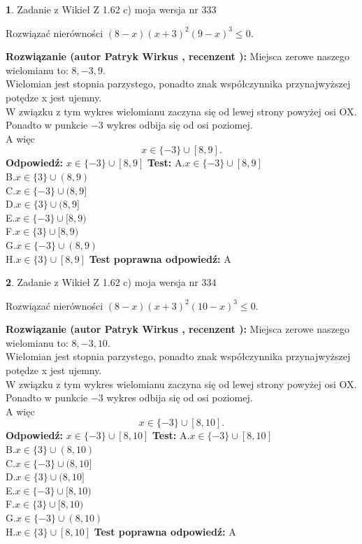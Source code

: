 \documentclass[12pt, a4paper]{article}
\theoremstyle{definition} %
\newtheorem{zad}{}
\newcommand{\zadStart}[1]{\begin{zad}#1\newline}
\newcommand{\zadStop}{\end{zad}}
\newcommand{\rozwStart}[2]{\noindent \textbf{Rozwiązanie (autor #1 , recenzent #2): }\newline}
\newcommand{\rozwStop}{\newline}
\newcommand{\odpStart}{\noindent \textbf{Odpowiedź:}\newline}
\newcommand{\odpStop}{\newline}
\newcommand{\testStart}{\noindent \textbf{Test:}\newline}
\newcommand{\testStop}{\newline}
\newcommand{\kluczStart}{\noindent \textbf{Test poprawna odpowiedź:}\newline}
\newcommand{\kluczStop}{\newline}
\begin{document}
\zadStart{Zadanie z Wikieł Z 1.62 c) moja wersja nr 333}

Rozwiązać nierówności $(8-x)(x+3)^{2}(9-x)^{3}\le0$.
\zadStop
\rozwStart{Patryk Wirkus}{}
Miejsca zerowe naszego wielomianu to: $8, -3, 9$.\\
Wielomian jest stopnia parzystego, ponadto znak współczynnika przy\linebreak najwyższej potędze x jest ujemny.\\ W związku z tym wykres wielomianu zaczyna się od lewej strony powyżej osi OX.\\
Ponadto w punkcie $-3$ wykres odbija się od osi poziomej.\\
A więc $$x \in \{-3\} \cup [8,9].$$
\rozwStop
\odpStart
$x \in \{-3\} \cup [8,9]$
\odpStop
\testStart
A.$x \in \{-3\} \cup [8,9]$\\
B.$x \in \{3\} \cup (8,9)$\\
C.$x \in \{-3\} \cup (8,9]$\\
D.$x \in \{3\} \cup (8,9]$\\
E.$x \in \{-3\} \cup [8,9)$\\
F.$x \in \{3\} \cup [8,9)$\\
G.$x \in \{-3\} \cup (8,9)$\\
H.$x \in \{3\} \cup [8,9]$
\testStop
\kluczStart
A
\kluczStop



\zadStart{Zadanie z Wikieł Z 1.62 c) moja wersja nr 334}

Rozwiązać nierówności $(8-x)(x+3)^{2}(10-x)^{3}\le0$.
\zadStop
\rozwStart{Patryk Wirkus}{}
Miejsca zerowe naszego wielomianu to: $8, -3, 10$.\\
Wielomian jest stopnia parzystego, ponadto znak współczynnika przy\linebreak najwyższej potędze x jest ujemny.\\ W związku z tym wykres wielomianu zaczyna się od lewej strony powyżej osi OX.\\
Ponadto w punkcie $-3$ wykres odbija się od osi poziomej.\\
A więc $$x \in \{-3\} \cup [8,10].$$
\rozwStop
\odpStart
$x \in \{-3\} \cup [8,10]$
\odpStop
\testStart
A.$x \in \{-3\} \cup [8,10]$\\
B.$x \in \{3\} \cup (8,10)$\\
C.$x \in \{-3\} \cup (8,10]$\\
D.$x \in \{3\} \cup (8,10]$\\
E.$x \in \{-3\} \cup [8,10)$\\
F.$x \in \{3\} \cup [8,10)$\\
G.$x \in \{-3\} \cup (8,10)$\\
H.$x \in \{3\} \cup [8,10]$
\testStop
\kluczStart
A
\kluczStop
\end{document}
